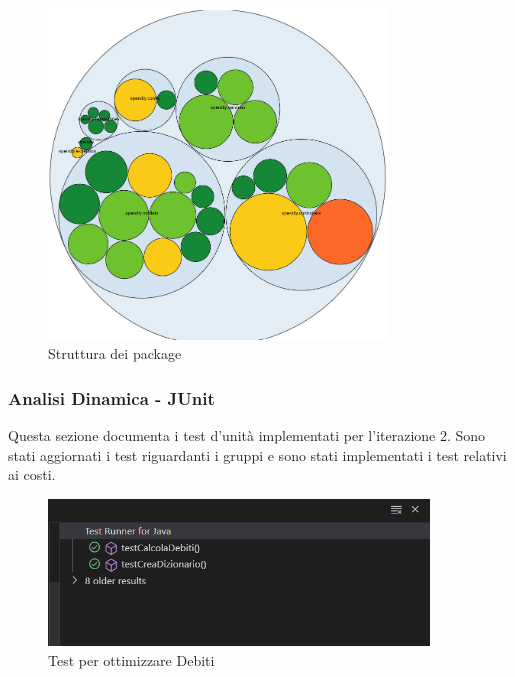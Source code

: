 \begin{figure}[H]
    \centering
    \includegraphics[width=0.8\textwidth]{images/Package_iter2.png}
    \caption{Struttura dei package}
    \label{fig:Package_iterazione2}
\end{figure}

\subsubsection{Analisi Dinamica - JUnit}

Questa sezione documenta i test d'unità implementati per l'iterazione 2. Sono stati aggiornati i test riguardanti i gruppi e sono stati implementati i test relativi ai costi.

\begin{figure}[H]
    \centering
    \includegraphics[width=0.9\textwidth]{images/CalcolaDebitiTest.png}
    \caption{Test per ottimizzare Debiti}
    \label{fig:CalcolaDebitiTest}
\end{figure}

